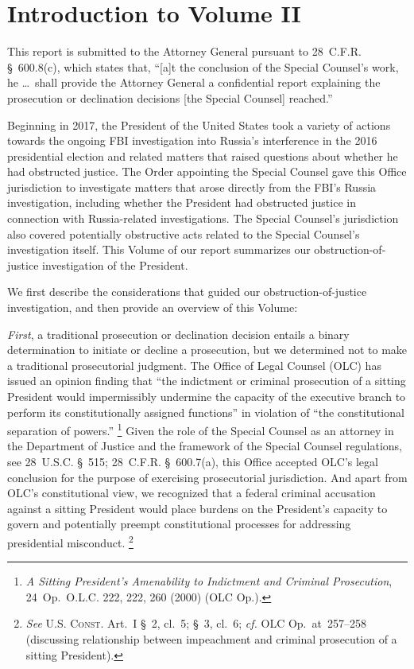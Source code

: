\section*{Introduction to Volume II}
\label{sec:introduction-2}

This report is submitted to the Attorney General pursuant to 28~C.F.R. \S~600.8(c), which states that, ``[a]t the conclusion of the Special Counsel's work, he \dots\ shall provide the Attorney General a confidential report explaining the prosecution or declination decisions [the Special Counsel] reached.''

Beginning in 2017, the President of the United States took a variety of actions towards the ongoing FBI investigation into Russia's interference in the 2016 presidential election and related matters that raised questions about whether he had obstructed justice.
The Order appointing the Special Counsel gave this Office jurisdiction to investigate matters that arose directly from the FBI's Russia investigation, including whether the President had obstructed justice in connection with Russia-related investigations.
The Special Counsel's jurisdiction also covered potentially obstructive acts related to the Special Counsel's investigation itself.
This Volume of our report summarizes our obstruction-of-justice investigation of the President.

We first describe the considerations that guided our obstruction-of-justice investigation, and then provide an overview of this Volume:

\textit{First}, a traditional prosecution or declination decision entails a binary determination to initiate or decline a prosecution, but we determined not to make a traditional prosecutorial judgment.
The Office of Legal Counsel (OLC) has issued an opinion finding that ``the indictment or criminal prosecution of a sitting President would impermissibly undermine the capacity of the executive branch to perform its constitutionally assigned functions'' in violation of ``the constitutional separation of powers.''%
\footnote{\textit{A Sitting President's Amenability to Indictment and Criminal Prosecution}, 24~Op.\ O.L.C. 222, 222, 260 (2000) (OLC Op.).}
Given the role of the Special Counsel as an attorney in the Department of Justice and the framework of the Special Counsel regulations, see 28~U.S.C. \S~515; 28~C.F.R. \S~600.7(a), this Office accepted OLC's legal conclusion for the purpose of exercising prosecutorial jurisdiction.
And apart from OLC's constitutional view, we recognized that a federal criminal accusation against a sitting President would place burdens on the President's capacity to govern and potentially preempt constitutional processes for addressing presidential misconduct.%
\footnote{\textit{See} \textsc{U.S. Const.} Art.~I \S~2, cl.~5; \S~3, cl.~6; \textit{cf.} OLC Op.\ at~257--258 (discussing relationship between impeachment and criminal prosecution of a sitting President).}

